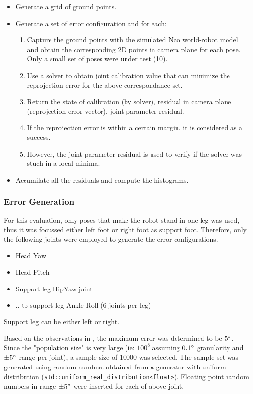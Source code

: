 \documentclass[english, printversion, nomenclature, notitle]{tuvisionthesis} %
\begin{document}
\begin{itemize}
	\item Generate a grid of ground points.
	\item Generate a set of error configuration and for each;
	\begin{enumerate}
		\item Capture the ground points with the simulated Nao world-robot model and obtain the corresponding 2D points in camera plane for each pose. Only a small set of poses were under test (10).
		\item Use a solver to obtain joint calibration value that can minimize the reprojection error for the above correspondance set.
		\item Return the state of calibration (by solver), residual in camera plane (reprojection error vector), joint parameter residual.
		\item If the reprojection error is within a certain margin, it is considered as a success.
		\item However, the joint parameter residual is used to verify if the solver was stuch in a local minima.
	\end{enumerate}
	\item Accumilate all the residuals and compute the histograms.
\end{itemize}

\subsubsection{Error Generation}
For this evaluation, only poses that make the robot stand in one leg was used, thus it was focussed either left foot or right foot as support foot. Therefore, only the following joints were employed to generate the error configurations.

\begin{itemize}
	\item Head Yaw
	\item Head Pitch
	\item Support leg HipYaw joint
	\item .. to support leg Ankle Roll (6 joints per leg)
\end{itemize}
Support leg can be either left or right.

Based on the observations in , the maximum error was determined to be $5\degree$. Since the "population size" is very large (ie: $100^8$ assuming $0.1\degree$ granularity and $\pm5\degree$ range per joint), a sample size of 10000 was selected. The sample set was generated using random numbers obtained from a generator with uniform distribution (\lstinline{std::uniform_real_distribution<float>}). Floating point random numbers in range $\pm5\degree$ were inserted for each of above joint. 
\end{document}
